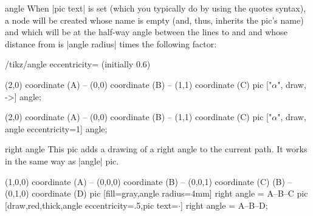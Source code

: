 \begin{pictype}{angle}{}
    When |pic text| is set (which you typically do by using the quotes syntax),
    a node will be created whose name is empty (and, thus, inherits the pic's
    name) and which will be at the half-way angle between the lines to 
    and  and whose distance from  is |angle radius| times the
    following factor:
    \begin{key}{/tikz/angle eccentricity= (initially 0.6)}
\begin{codeexample}[]
\tikz \draw (2,0) coordinate (A) -- (0,0) coordinate (B)
         -- (1,1) coordinate (C)
  pic ["$\alpha$", draw, ->] {angle};
\end{codeexample}
\begin{codeexample}[]
\tikz \draw (2,0) coordinate (A) -- (0,0) coordinate (B)
         -- (1,1) coordinate (C)
  pic ["$\alpha$", draw, angle eccentricity=1] {angle};
\end{codeexample}
\begin{codeexample}[]
\end{codeexample}
    \end{key}
\end{pictype}

\begin{pictype}{right angle}{}
    This pic adds a drawing of a right angle to the current path. It works in
    the same way as |angle| pic.
\begin{codeexample}[]
  \tikz
    \draw (1,0,0) coordinate (A) -- (0,0,0) coordinate (B)
      -- (0,0,1)  coordinate (C)
      (B) -- (0,1,0) coordinate (D)
      pic [fill=gray,angle radius=4mm] {right angle = A--B--C}
      pic [draw,red,thick,angle eccentricity=.5,pic text=$\cdot$]
        {right angle = A--B--D};
\end{codeexample}
\end{pictype}


